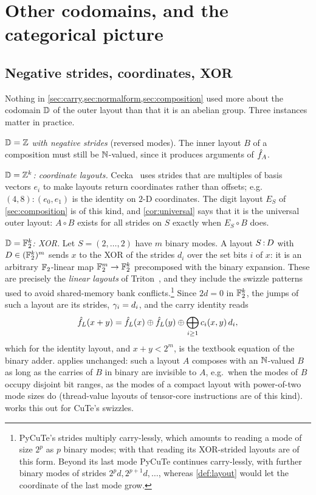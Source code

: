 \section{Other codomains, and the categorical picture}\label{sec:beyond}

\subsection{Negative strides, coordinates, XOR}

Nothing in \cref{sec:carry,sec:normalform,sec:composition} used more about the codomain $\mathbb{D}$ of
the outer layout than that it is an abelian group. Three instances matter in practice.

\emph{$\mathbb{D}=\mathbb{Z}$ with negative strides} (reversed modes). The inner layout $B$ of a composition
must still be $\mathbb{N}$-valued, since it produces arguments of $\hat{f}_{A}$.

\emph{$\mathbb{D}=\mathbb{Z}^k$: coordinate layouts.} Cecka~\cite{cecka2026} uses strides that are multiples of
basis vectors $e_i$ to make layouts return coordinates rather than offsets; e.g.\
$(4,8):(e_0,e_1)$ is the identity on $2$-D coordinates. The digit layout $E_S$ of
\cref{sec:composition} is of this kind, and \cref{cor:universal} says that it is the universal
outer layout: $A\circ B$ exists for all strides on $S$ exactly when $E_S\circ B$ does.

\emph{$\mathbb{D}=\mathbb{F}_2^k$: XOR.} Let $S=(2,\dots,2)$ have $m$ binary modes. A layout
$S\,{:}\,D$ with $D\in(\mathbb{F}_2^k)^m$ sends $x$ to the XOR of the strides $d_i$ over the set bits $i$ of
$x$: it is an arbitrary $\mathbb{F}_2$-linear map $\mathbb{F}_2^m\to\mathbb{F}_2^k$ precomposed with the binary expansion.
These are precisely the \emph{linear layouts} of Triton~\cite{zhou2026}, and they include the
swizzle patterns used to avoid shared-memory bank conflicts.\footnote{PyCuTe's \code{F2} strides
multiply carry-lessly, which amounts to reading a mode of size $2^p$ as $p$ binary modes; with
that reading its XOR-strided layouts are of this form. Beyond its last mode PyCuTe continues
carry-lessly, with further binary modes of strides $2^pd,2^{p+1}d,\dots$, whereas
\cref{def:layout} would let the coordinate of the last mode grow.} Since $2d=0$ in $\mathbb{F}_2^k$, the jumps of
such a layout are its strides, $\gamma_i=d_i$, and the carry identity reads
\[ \hat{f}_{L}(x+y)=\hat{f}_{L}(x)\oplus\hat{f}_{L}(y)\oplus\bigoplus_{i\ge1}c_i(x,y)\,d_i , \]
which for the identity layout, and $x+y<2^m$, is the textbook equation of the binary adder.
\Cref{thm:defect} applies unchanged: such a layout $A$ composes with an $\mathbb{N}$-valued $B$ as
long as the carries of $B$ in binary are invisible to $A$, e.g.\ when the modes of $B$ occupy
disjoint bit ranges, as the modes of a compact layout with power-of-two mode sizes do
(thread-value layouts of tensor-core instructions are of this kind).  works
this out for CuTe's swizzles.

